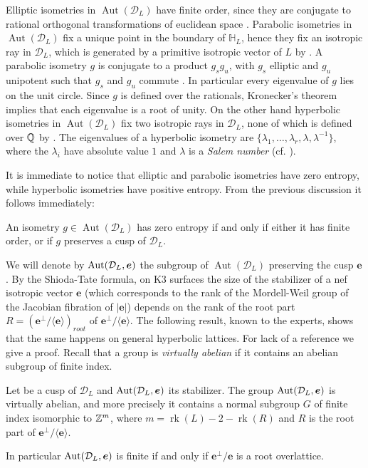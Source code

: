 \documentclass[11pt,letterpaper]{amsart}
\newcommand{\vect}[1]{\boldsymbol{#1}}
\DeclareMathOperator{\rk}{rk}
\DeclareMathOperator{\Aut}{Aut}
\begin{document}
Elliptic isometries in $\Aut(\mathcal{D}_L)$ have finite order, since they are conjugate to rational orthogonal transformations of euclidean space \cite[Theorem~5.7.1]{ratcliffe}.
Parabolic isometries in $\Aut(\mathcal{D}_L)$ fix a unique point in the boundary of $\mathbb{H}_L$, hence they fix an isotropic ray in $\mathcal{D}_L$, which is generated by a primitive isotropic vector of $L$ by \cite[Remarque~1.1]{cantat.dynamics.K3.1}. 
A parabolic isometry $g$ is conjugate to a product $g_sg_u$, with $g_s$ elliptic and $g_u$ unipotent such that $g_s$ and $g_u$ commute \cite[Theorem~4.7.3]{ratcliffe}. In particular every eigenvalue of $g$ lies on the unit circle.
Since $g$ is defined over the rationals, Kronecker's theorem implies that each eigenvalue is a root of unity. 
On the other hand hyperbolic isometries in $\Aut(\mathcal{D}_L)$ fix two isotropic rays in $\mathcal{D}_L$, none of which is defined over $\mathbb{Q}$ by \cite[Remarque~1.1]{cantat.dynamics.K3.1}. The eigenvalues of a hyperbolic isometry are $\{\lambda_1,\ldots,\lambda_r,\lambda,\lambda^{-1}\}$, where the $\lambda_i$ have absolute value $1$ and $\lambda$ is a \emph{Salem number} (cf. \cite[Discussion~before~Définition~1.2]{cantat.dynamics.K3.1}).

It is immediate to notice that elliptic and parabolic isometries have zero entropy, while hyperbolic isometries have positive entropy. From the previous discussion it follows immediately:

\begin{proposition} \label{prop:zero.entropy.isotropic}
An isometry $g\in \Aut(\mathcal{D}_L)$ has zero entropy if and only if either it has finite order, or if $g$ preserves a cusp of $\mathcal{D}_L$.
\end{proposition}

We will denote by $\Stabe$ the subgroup of $\Aut(\mathcal{D}_L)$ preserving the cusp $\vect{e}$.
By the Shioda-Tate formula, on K3 surfaces the size of the stabilizer of a nef isotropic vector $\vect{e}$ (which corresponds to the rank of the Mordell-Weil group of the Jacobian fibration of $|\vect{e}|$) depends on the rank of the root part $R=(\vect{e}^\perp /\langle \vect{e}\rangle)_{root}$ of $\vect{e}^\perp /\langle \vect{e}\rangle$. The following result, known to the experts, shows that the same happens on general hyperbolic lattices. For lack of a reference we give a proof. Recall that a group is \emph{virtually abelian} if it contains an abelian subgroup of finite index. 

\begin{proposition} \label{prop:generalization.Shioda.Tate}
Let be a cusp of $\mathcal{D}_L$ and $\Stabe$ its stabilizer. The group $\Stabe$ is virtually abelian, and more precisely it contains a normal subgroup $G$ of finite index isomorphic to $\mathbb{Z}^m$, where $m=\rk(L)-2-\rk(R)$ and $R$ is the root part of $\vect{e}^\perp /\langle \vect{e}\rangle$.

In particular $\Stabe$ is finite if and only if $\vect{e}^\perp / \vect{e}$ is a root overlattice.
\end{proposition}
\end{document}

